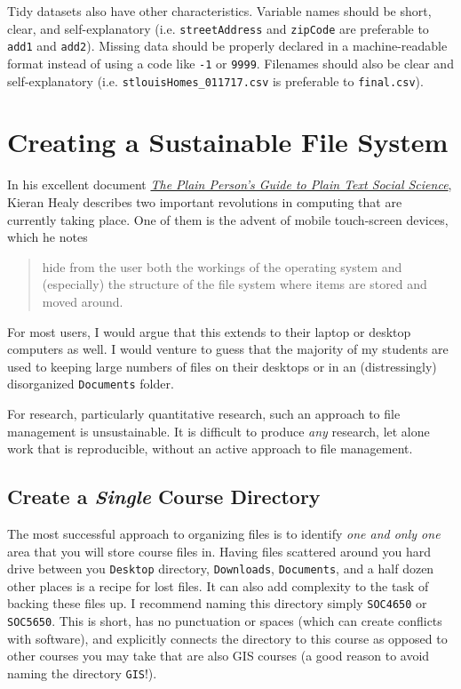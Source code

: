 \documentclass[]{book}
\theoremstyle{definition}
\theoremstyle{definition}
\theoremstyle{definition}
\theoremstyle{remark}
\begin{document}
Tidy datasets also have other characteristics. Variable names should be
short, clear, and self-explanatory (i.e. \texttt{streetAddress} and
\texttt{zipCode} are preferable to \texttt{add1} and \texttt{add2}).
Missing data should be properly declared in a machine-readable format
instead of using a code like \texttt{-1} or \texttt{9999}. Filenames
should also be clear and self-explanatory (i.e.
\texttt{stlouisHomes\_011717.csv} is preferable to \texttt{final.csv}).

\section{Creating a Sustainable File
System}\label{creating-a-sustainable-file-system}

In his excellent document \href{http://plain-text.co}{\emph{The Plain
Person's Guide to Plain Text Social Science}}, Kieran Healy describes
two important revolutions in computing that are currently taking place.
One of them is the advent of mobile touch-screen devices, which he notes

\begin{quote}
hide from the user both the workings of the operating system and
(especially) the structure of the file system where items are stored and
moved around.
\end{quote}

For most users, I would argue that this extends to their laptop or
desktop computers as well. I would venture to guess that the majority of
my students are used to keeping large numbers of files on their desktops
or in an (distressingly) disorganized \texttt{Documents} folder.

For research, particularly quantitative research, such an approach to
file management is unsustainable. It is difficult to produce \emph{any}
research, let alone work that is reproducible, without an active
approach to file management.

\subsection{\texorpdfstring{Create a \emph{Single} Course
Directory}{Create a Single Course Directory}}\label{create-a-single-course-directory}

The most successful approach to organizing files is to identify
\emph{one and only one} area that you will store course files in. Having
files scattered around you hard drive between you \texttt{Desktop}
directory, \texttt{Downloads}, \texttt{Documents}, and a half dozen
other places is a recipe for lost files. It can also add complexity to
the task of backing these files up. I recommend naming this directory
simply \texttt{SOC4650} or \texttt{SOC5650}. This is short, has no
punctuation or spaces (which can create conflicts with software), and
explicitly connects the directory to this course as opposed to other
courses you may take that are also GIS courses (a good reason to avoid
naming the directory \texttt{GIS}!).
\end{document}
